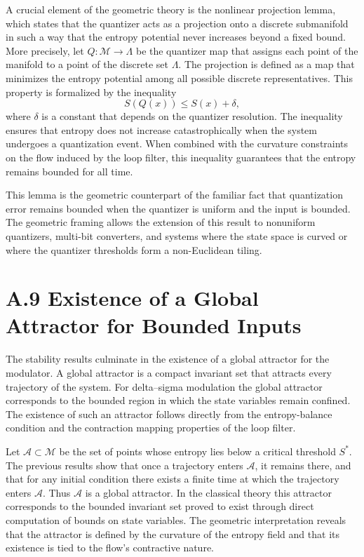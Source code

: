 A crucial element of the geometric theory is the nonlinear projection lemma, which states that the quantizer acts as a projection onto a discrete submanifold in such a way that the entropy potential never increases beyond a fixed bound. More precisely, let \(Q:\mathcal{M} \to \Lambda\) be the quantizer map that assigns each point of the manifold to a point of the discrete set \(\Lambda\). The projection is defined as a map that minimizes the entropy potential among all possible discrete representatives. This property is formalized by the inequality
\[
S(Q(x)) \leq S(x) + \delta,
\]
where \(\delta\) is a constant that depends on the quantizer resolution. The inequality ensures that entropy does not increase catastrophically when the system undergoes a quantization event. When combined with the curvature constraints on the flow induced by the loop filter, this inequality guarantees that the entropy remains bounded for all time.

This lemma is the geometric counterpart of the familiar fact that quantization error remains bounded when the quantizer is uniform and the input is bounded. The geometric framing allows the extension of this result to nonuniform quantizers, multi-bit converters, and systems where the state space is curved or where the quantizer thresholds form a non-Euclidean tiling.

\section{A.9 Existence of a Global Attractor for Bounded Inputs}

The stability results culminate in the existence of a global attractor for the modulator. A global attractor is a compact invariant set that attracts every trajectory of the system. For delta–sigma modulation the global attractor corresponds to the bounded region in which the state variables remain confined. The existence of such an attractor follows directly from the entropy-balance condition and the contraction mapping properties of the loop filter.

Let \(\mathcal{A}\subset \mathcal{M}\) be the set of points whose entropy lies below a critical threshold \(S^\ast\). The previous results show that once a trajectory enters \(\mathcal{A}\), it remains there, and that for any initial condition there exists a finite time at which the trajectory enters \(\mathcal{A}\). Thus \(\mathcal{A}\) is a global attractor. In the classical theory this attractor corresponds to the bounded invariant set proved to exist through direct computation of bounds on state variables. The geometric interpretation reveals that the attractor is defined by the curvature of the entropy field and that its existence is tied to the flow’s contractive nature.

